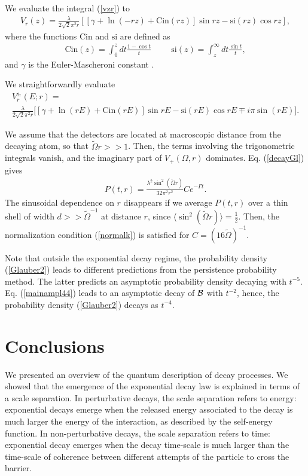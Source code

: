 \documentclass[12pt]{article}
\numberwithin{equation}{section}
\begin{document}
We evaluate the integral (\ref{vzr}) to
\begin{eqnarray}
V_r(z) =  \frac{\lambda}{2\sqrt{2} \pi^2r}  \left[ [\gamma + \ln(-rz) + \mbox{Cin}(rz)] \sin rz - \mbox{si}(rz)\cos rz\right],
 \end{eqnarray}
where the functions
 $\mbox{Cin}$ and $\mbox{si}$ are    defined as
\begin{eqnarray}
\mbox{Cin}(z) = \int_0^z dt \frac{1-\cos t}{t} \hspace{1cm} \mbox{si}(z) = \int_z^{\infty} dt \frac{\sin t}{t}, \label{CiSi}
\end{eqnarray}
and $\gamma$ is the Euler-Mascheroni constant \cite{ASt}.

We straightforwardly evaluate
\begin{multline}
V_r^{\pm}(E;r) = \\
\frac{\lambda}{2\sqrt{2} \pi^2r}  \bigl[ [\gamma + \ln(rE) + \mbox{Cin}(rE)] \sin rE - \mbox{si}(rE)\cos rE \mp i \pi \sin(rE)\bigl].
\end{multline}

We assume that the detectors are located at macroscopic distance from the decaying atom, so that $\tilde{\Omega}r >> 1$. Then, the terms involving the trigonometric integrals vanish, and the imaginary part of $V_+(\Omega, r)$  dominates. Eq. (\ref{decayGl}) gives
\begin{eqnarray}
P(t, r) =  \frac{\lambda^2 \sin^2(\tilde{ \Omega} r)}{32 \pi^2 r^2} C e^{-\Gamma t}.
\end{eqnarray}
 The sinusoidal dependence  on $r$ disappears if we average $P(t, r)$ over a thin shell of width $d >> \tilde{\Omega}^{-1}$ at distance $r$, since $\langle\sin^2(\tilde{\Omega}r)\rangle = \frac{1}{2}$. Then, the normalization condition (\ref{normalk}) is satisfied for $C = (16 \tilde{\Omega})^{-1} $.

  Note that outside the exponential decay regime, the probability density (\ref{Glauber2}) leads to different predictions from the persistence probability method. The latter predicts an asymptotic probability density decaying with $t^{-5}$. Eq. (\ref{mainampl44}) leads to an asymptotic decay of ${\cal B}$ with $t^{-2}$, hence,  the probability density (\ref{Glauber2})
decays as $t^{-4}$.


\section{Conclusions}
We presented an overview of the quantum description of decay processes. We showed that the emergence of the exponential decay law is explained in terms of a scale separation. In perturbative decays, the scale separation refers to energy: exponential decays emerge when the released energy associated to the decay  is much larger the energy of the interaction, as described by the self-energy function. In non-perturbative decays, the scale separation refers to time: exponential decay emerges when the decay time-scale is much larger than the time-scale of coherence between different attempts of the particle to cross the barrier.
\end{document}
